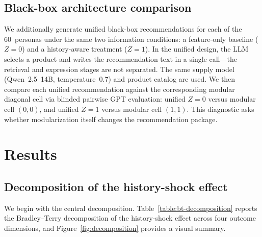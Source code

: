 \documentclass[11pt]{article}
\begin{document}
\subsection{Black-box architecture comparison}

We additionally generate unified black-box recommendations for each of the 60~personas under the same two information conditions: a feature-only baseline ($Z = 0$) and a history-aware treatment ($Z = 1$). In the unified design, the LLM selects a product and writes the recommendation text in a single call---the retrieval and expression stages are not separated. The same supply model (Qwen~2.5~14B, temperature~0.7) and product catalog are used. We then compare each unified recommendation against the corresponding modular diagonal cell via blinded pairwise GPT evaluation: unified $Z = 0$ versus modular cell $(0,0)$, and unified $Z = 1$ versus modular cell $(1,1)$. This diagnostic asks whether modularization itself changes the recommendation package.

\section{Results}\label{section:results}

\subsection{Decomposition of the history-shock effect}

We begin with the central decomposition. Table~\ref{table:bt-decomposition} reports the Bradley--Terry decomposition of the history-shock effect across four outcome dimensions, and Figure~\ref{fig:decomposition} provides a visual summary.
\end{document}
